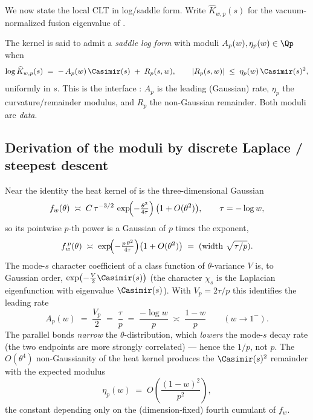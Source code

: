 We now state the local CLT in log/saddle form.  Write $\widehat K_{w,p}(s)$ for the
vacuum-normalized fusion eigenvalue of .

\begin{definition}
\label{def:core-b-saddle}
The kernel is said to admit a \emph{saddle log form} with moduli
$A_p(w),\eta_p(w)\in\Qp$ when
\begin{equation}
  \log \widehat K_{w,p}(s)
    \;=\; -\,A_p(w)\,\Casimir(s) \;+\; R_p(s,w),
  \qquad
  |R_p(s,w)| \;\le\; \eta_p(w)\,\Casimir(s)^{2},
  \label{eq:core-b-saddle}
\end{equation}
uniformly in $s$.  This is the interface
: $A_p$ is the leading (Gaussian) rate,
$\eta_p$ the curvature/remainder modulus, and $R_p$ the non-Gaussian remainder.
Both moduli are \emph{data}.
\end{definition}

\subsection{Derivation of the moduli by discrete Laplace / steepest descent}

Near the identity the heat kernel of  is the
three-dimensional Gaussian
\[
  f_w(\theta) \;\asymp\; C\,\tau^{-3/2}\,
    \exp\!\Bigl(-\tfrac{\theta^{2}}{4\tau}\Bigr)\,\bigl(1+O(\theta^{2})\bigr),
  \qquad \tau = -\log w,
\]
so its pointwise $p$-th power is a Gaussian of $p$ times the exponent,
\[
  f_w^{\,p}(\theta) \;\asymp\; \exp\!\Bigl(-\tfrac{p\,\theta^{2}}{4\tau}\Bigr)
    \bigl(1+O(\theta^{2})\bigr)
  \;=\; (\text{width }\sqrt{\tau/p}).
\]
The mode-$s$ character coefficient of a class function of $\theta$-variance
$V$ is, to Gaussian order, $\exp\bigl(-\tfrac{V}{2}\Casimir(s)\bigr)$ (the character
$\chi_s$ is the Laplacian eigenfunction with eigenvalue $\Casimir(s)$).  With
$V_p = 2\tau/p$ this identifies the leading rate
\begin{equation}
  A_p(w) \;=\; \frac{V_p}{2} \;=\; \frac{\tau}{p}
    \;=\; \frac{-\log w}{p}\;\asymp\;\frac{1-w}{p}\qquad(w\to 1^{-}).
  \label{eq:core-b-Ap}
\end{equation}
The parallel bonds \emph{narrow} the $\theta$-distribution, which \emph{lowers} the
mode-$s$ decay rate (the two endpoints are more strongly correlated) — hence the
$1/p$, not $p$.  The $O(\theta^{4})$ non-Gaussianity of the \SUtwo{} heat kernel
produces the $\Casimir(s)^{2}$ remainder with the expected modulus
\begin{equation}
  \eta_p(w) \;=\; O\!\left(\frac{(1-w)^{2}}{p^{2}}\right),
  \label{eq:core-b-etap}
\end{equation}
the constant depending only on the (dimension-fixed) fourth cumulant of $f_w$.

